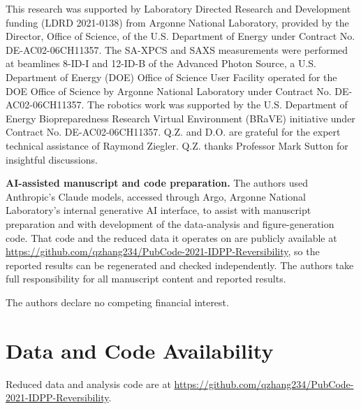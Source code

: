 \documentclass[journal=nalefd,manuscript=letter,layout=traditional]{achemso}
\begin{document}
\begin{acknowledgement}
This research was supported by Laboratory Directed Research and Development funding (LDRD 2021-0138) from Argonne National Laboratory, provided by the Director, Office of Science, of the U.S. Department of Energy under Contract No. DE-AC02-06CH11357. The SA-XPCS and SAXS measurements were performed at beamlines 8-ID-I and 12-ID-B of the Advanced Photon Source, a U.S. Department of Energy (DOE) Office of Science User Facility operated for the DOE Office of Science by Argonne National Laboratory under Contract No. DE-AC02-06CH11357. The robotics work was supported by the U.S. Department of Energy Biopreparedness Research Virtual Environment (BRaVE) initiative under Contract No. DE-AC02-06CH11357. Q.Z. and D.O. are grateful for the expert technical assistance of Raymond Ziegler. Q.Z. thanks Professor Mark Sutton for insightful discussions.

\textbf{AI-assisted manuscript and code preparation.} The authors used Anthropic's Claude models, accessed through Argo, Argonne National Laboratory's internal generative AI interface, to assist with manuscript preparation and with development of the data-analysis and figure-generation code. That code and the reduced data it operates on are publicly available at \url{https://github.com/qzhang234/PubCode-2021-IDPP-Reversibility}, so the reported results can be regenerated and checked independently. The authors take full responsibility for all manuscript content and reported results.
\end{acknowledgement}

The authors declare no competing financial interest.

\section*{Data and Code Availability}
Reduced data and analysis code are at
\url{https://github.com/qzhang234/PubCode-2021-IDPP-Reversibility}.


\end{document}

